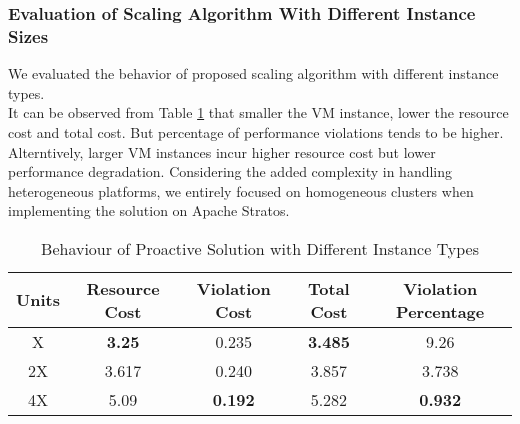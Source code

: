 \subsubsection{Evaluation of Scaling Algorithm With Different Instance Sizes}
We evaluated the behavior of proposed scaling algorithm with different instance types.\\

It can be observed from Table \ref{dif_instance} that smaller the VM instance, lower the resource cost and total cost. But percentage of performance violations tends to be higher. Alterntively, larger VM instances incur higher resource cost but lower performance degradation. Considering the added complexity in handling heterogeneous platforms, we entirely focused on homogeneous clusters when implementing the solution on Apache Stratos.

\begin{table}
\caption{Behaviour of Proactive Solution with Different Instance Types}
\centering
\label{dif_instance}
\begin{tabular}{|c|c|c|c|c|}
\hline
Units
& Resource Cost
& Violation Cost
& Total Cost
& Violation Percentage
\\ \hline
X
&\textbf{3.25} 
&0.235
&\textbf{3.485}
&9.26
\\ \hline
2X
&3.617
&0.240
&3.857
&3.738
\\ \hline
4X
&5.09
&\textbf{0.192}
&5.282
&\textbf{0.932}
\\ \hline
\end{tabular}
\end{table}